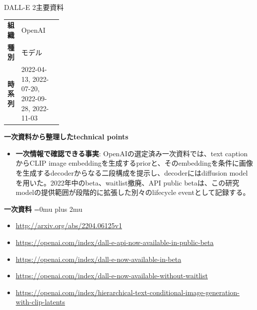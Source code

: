 \begin{technicalnote}{DALL-E 2}{主要資料}
\begingroup
\begin{tabularx}{\linewidth}{@{}>{\bfseries}p{0.22\linewidth}X@{}}
組織 & OpenAI \\
種別 & モデル \\
時系列 & 2022-04-13, 2022-07-20, 2022-09-28, 2022-11-03 \\
\end{tabularx}
\smallskip
{\bfseries 一次資料から整理したtechnical points}
\begin{itemize}[leftmargin=1.5em,itemsep=0.35em]
\item \textbf{一次情報で確認できる事実}: OpenAIの選定済み一次資料では、text captionからCLIP image embeddingを生成するpriorと、そのembeddingを条件に画像を生成するdecoderからなる二段構成を提示し、decoderにはdiffusion modelを用いた。2022年中のbeta、waitlist撤廃、API public betaは、この研究modelの提供範囲が段階的に拡張した別々のlifecycle eventとして記録する。
\end{itemize}
\begin{minipage}{\linewidth}
\begin{samepage}
{\bfseries 一次資料}
\begingroup\sloppy
\Urlmuskip=0mu plus 2mu\relax
\begin{itemize}[leftmargin=1.5em,itemsep=0.25em]
\item {\scriptsize\url{http://arxiv.org/abs/2204.06125v1}}
\item {\scriptsize\url{https://openai.com/index/dall-e-api-now-available-in-public-beta}}
\item {\scriptsize\url{https://openai.com/index/dall-e-now-available-in-beta}}
\item {\scriptsize\url{https://openai.com/index/dall-e-now-available-without-waitlist}}
\item {\scriptsize\url{https://openai.com/index/hierarchical-text-conditional-image-generation-with-clip-latents}}
\end{itemize}
\endgroup
\end{samepage}
\end{minipage}
\endgroup
\end{technicalnote}
\medskip

